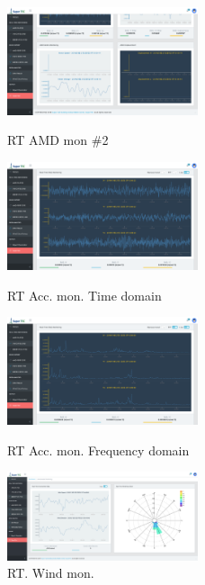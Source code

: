 \begin{itemize}[label=]
\begin{itemize}[label=]
\begin{figure}[!ht]
\begin{fullwidth}
				            \parbox{0.5\textwidth}{
					            \centering
					            \includegraphics[width=0.5\textwidth]{images/TM21 Vibration Controller Monitroing - amd2}
					            \caption*{RT AMD mon \#2}
				            }
				            \parbox{0.5\textwidth}{
					            \centering
					            \includegraphics[width=0.5\textwidth]{images/TM21 Vibration Controller Monitroing - time2}
					            \caption*{RT Acc. mon. Time domain}
				            }\qquad
				            \parbox{0.5\textwidth}{
					            \centering
					            \includegraphics[width=0.5\textwidth]{images/TM21 Vibration Controller Monitroing - fft2}
					            \caption*{RT Acc. mon. Frequency domain}
				            }\qquad
				            \parbox{0.5\textwidth}{
					            \centering
					            \includegraphics[width=0.5\textwidth]{images/TM21 Vibration Controller Monitroing - 220.149.227.106}
					            \caption*{RT. Wind mon.}
				            }
			            \end{fullwidth}

\end{figure}
\end{itemize}
\end{itemize}
